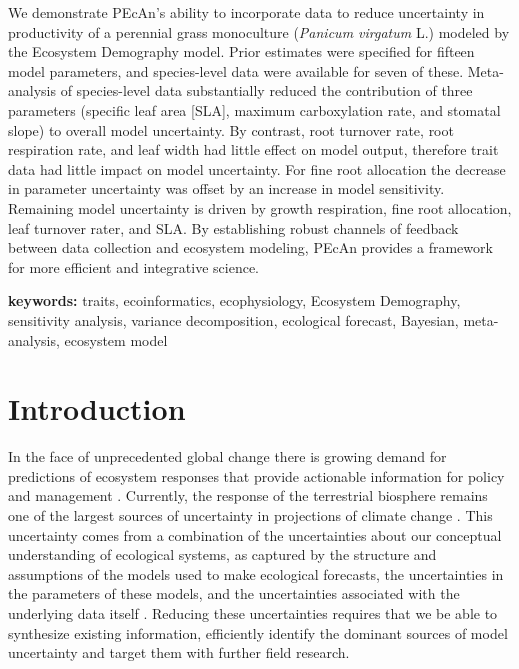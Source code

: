 \documentclass[12pt]{article}
\begin{document}
\begin{flushleft}
\begin{spacing}{1.9}
 We demonstrate PEcAn's ability to incorporate data to reduce uncertainty in productivity of a perennial grass monoculture (\textit{Panicum virgatum} L.) modeled by the Ecosystem Demography model. 
 Prior estimates were specified for fifteen model parameters, and species-level data were available for seven of these. 
 Meta-analysis of species-level data substantially reduced the contribution of three parameters (specific leaf area [SLA], maximum carboxylation rate, and stomatal slope) to overall model uncertainty. 
 By contrast, root turnover rate, root respiration rate, and leaf width had little effect on model output, therefore trait data had little impact on model uncertainty. 
 For fine root allocation the decrease in parameter uncertainty was offset by an increase in model sensitivity.
 Remaining model uncertainty is driven by growth respiration, fine root allocation, leaf turnover rater, and SLA. 
By establishing robust channels of feedback between data collection and ecosystem modeling, PEcAn provides a framework for more efficient and integrative science.

\textbf{keywords:}  traits, ecoinformatics, ecophysiology, Ecosystem Demography, sensitivity analysis, variance decomposition, ecological forecast, Bayesian, meta-analysis, ecosystem model

\newpage

\section*{Introduction}
\label{sec:intro}

 In the face of unprecedented global change there is growing demand for predictions of ecosystem responses that provide actionable information for policy and management  \citep{clark2001efe}.
 Currently, the response of the terrestrial biosphere remains one of the largest sources of uncertainty in projections of climate change \citep{denman2007cbc}.
 This uncertainty comes from a combination of the uncertainties about our conceptual understanding of ecological systems, as captured by the structure and assumptions of the models used to make ecological forecasts, the uncertainties in the parameters of these models, and the uncertainties associated with the underlying data itself \citep{mcmahon2009pfu}.
 Reducing these uncertainties requires that we be able to synthesize existing information, efficiently identify the dominant sources of model uncertainty and target them with further field research.


\end{spacing}
\end{flushleft}
\end{document}
